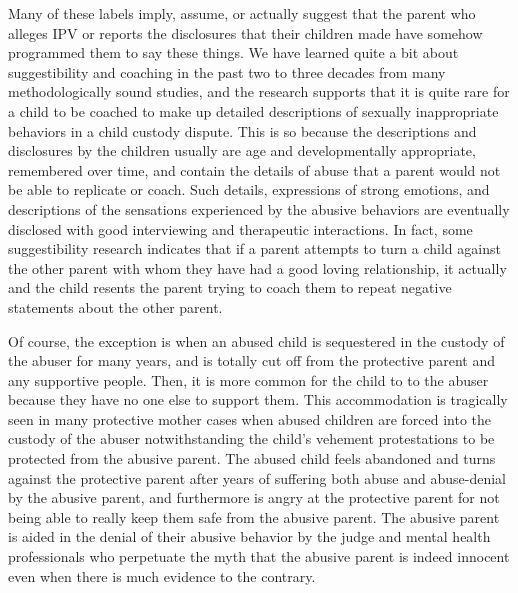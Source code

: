 Many of these labels imply, assume, or actually suggest that the parent
who alleges IPV or reports the disclosures that their children made have
somehow programmed them to say these things. We have learned quite
a bit about suggestibility and coaching in the past two to three decades
from many methodologically sound studies, and the research supports
that it is quite rare for a child to be coached to make up detailed descriptions of sexually inappropriate behaviors in a child custody dispute. This
is so because the descriptions and disclosures by the children usually are
age and developmentally appropriate, remembered over time, and contain the details of abuse that a parent would not be able to replicate or
coach. Such details, expressions of strong emotions, and descriptions
of the sensations experienced by the abusive behaviors 
are eventually disclosed with good interviewing and therapeutic interactions. In fact,
some suggestibility research indicates that if a parent attempts to turn a
child against the other parent with whom they have had a good loving
relationship, it actually  and the child resents the parent
trying to coach them to repeat negative statements about the other
parent. \pfl{}

\enlargethispage{1em}
Of course, the exception is when an abused child is sequestered in the
custody of the abuser for many years, and is totally cut off from 
the protective parent and any supportive people. Then, it is more common for
the child to  to the abuser because they have no one else
to support them. This accommodation is tragically seen in 
many protective mother cases when abused children are forced into the custody of
the abuser notwithstanding the child's vehement protestations 
to be protected from the abusive parent. The abused child feels abandoned and
turns against the protective parent after years of suffering both abuse
and abuse-denial by the abusive parent, and furthermore is angry at the
protective parent for not being able to really keep them safe from the
abusive parent. The abusive parent is aided in the denial of their abusive
behavior by the judge and mental health professionals who perpetuate
the myth that the abusive parent is indeed innocent even when there is
much evidence to the contrary. \pfl{}\newpage{}

